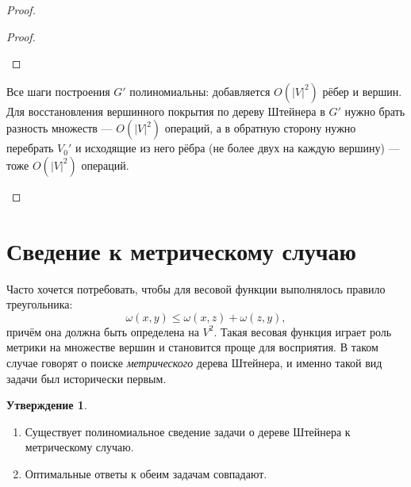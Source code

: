\documentclass[11pt,a4paper]{report}
\def\le{\leqslant}
\theoremstyle{definition}
\theoremstyle{definition}
\newtheorem{preposition}{Утверждение}[section]
\theoremstyle{definition}
\begin{document}
\begin{proof}
\begin{enumerate}
\begin{proof}
\begin{itemize}
				\end{itemize} 
			\end{proof}
			Все шаги построения $G'$ полиномиальны: добавляется $O(|V|^2)$ рёбер и вершин. Для восстановления вершинного покрытия по дереву Штейнера в $G'$ нужно брать разность множеств — $O(|V|^2)$ операций, а в обратную сторону нужно перебрать $V_0'$ и исходящие из него рёбра (не более двух на каждую вершину) — тоже $O(|V|^2)$ операций.
		\end{enumerate}
	\end{proof}
	\section{Сведение к метрическому случаю}
		Часто хочется потребовать, чтобы для весовой функции выполнялось правило треугольника:
		$$
			\omega(x, y) \le \omega(x, z) + \omega(z, y),		
		$$
		причём она должна быть определена на $V^2$. Такая весовая функция играет роль метрики на множестве вершин и становится проще для восприятия. В таком случае говорят о поиске \textit{метрического} дерева Штейнера, и именно такой вид задачи был исторически первым.
		\begin{preposition}$  $
			\begin{enumerate}
				\item Существует полиномиальное сведение задачи о дереве Штейнера к метрическому случаю.
				\item Оптимальные ответы к обеим задачам совпадают.
			\end{enumerate}
		\end{preposition}
\end{document}

